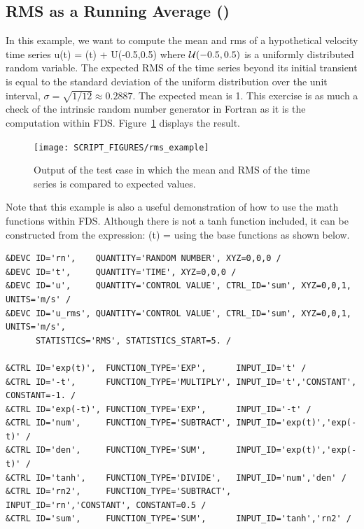 \documentclass[11pt]{book}
\begin{document}
\subsection{RMS as a Running Average (\texorpdfstring{}{rms\_example})}
\label{rms_example}

In this example, we want to compute the mean and rms of a hypothetical velocity time series
\be
   u(t) = \tanh(t) + {\cal U}(-0.5,0.5)
\ee
where ${\cal U}(-0.5,0.5)$ is a uniformly distributed random variable. The expected RMS of the time series beyond its initial transient is equal to the standard deviation of the uniform distribution over the unit interval, $\sigma=\sqrt{1/12}\approx 0.2887$. The expected mean is 1. This exercise is as much a check of the intrinsic random number generator in Fortran as it is the computation within FDS. Figure~\ref{rms_example_plot} displays the result.
\begin{figure}[h!]
\centering
\texttt{[image: SCRIPT\_FIGURES/rms\_example]}
\caption[Sample case ]{Output of the  test case in which the mean and RMS of the time series is compared to expected values.}
\label{rms_example_plot}
\end{figure}
Note that this example is also a useful demonstration of how to use the math functions within FDS. Although there is not a tanh function included, it can be constructed from the expression:
\be
   \tanh(t) = 
\ee
using the base functions as shown below.
\begin{lstlisting}
&DEVC ID='rn',    QUANTITY='RANDOM NUMBER', XYZ=0,0,0 /
&DEVC ID='t',     QUANTITY='TIME', XYZ=0,0,0 /
&DEVC ID='u',     QUANTITY='CONTROL VALUE', CTRL_ID='sum', XYZ=0,0,1, UNITS='m/s' /
&DEVC ID='u_rms', QUANTITY='CONTROL VALUE', CTRL_ID='sum', XYZ=0,0,1, UNITS='m/s',
      STATISTICS='RMS', STATISTICS_START=5. /

&CTRL ID='exp(t)',  FUNCTION_TYPE='EXP',      INPUT_ID='t' /
&CTRL ID='-t',      FUNCTION_TYPE='MULTIPLY', INPUT_ID='t','CONSTANT', CONSTANT=-1. /
&CTRL ID='exp(-t)', FUNCTION_TYPE='EXP',      INPUT_ID='-t' /
&CTRL ID='num',     FUNCTION_TYPE='SUBTRACT', INPUT_ID='exp(t)','exp(-t)' /
&CTRL ID='den',     FUNCTION_TYPE='SUM',      INPUT_ID='exp(t)','exp(-t)' /
&CTRL ID='tanh',    FUNCTION_TYPE='DIVIDE',   INPUT_ID='num','den' /
&CTRL ID='rn2',     FUNCTION_TYPE='SUBTRACT', INPUT_ID='rn','CONSTANT', CONSTANT=0.5 /
&CTRL ID='sum',     FUNCTION_TYPE='SUM',      INPUT_ID='tanh','rn2' /
\end{lstlisting}
\end{document}
